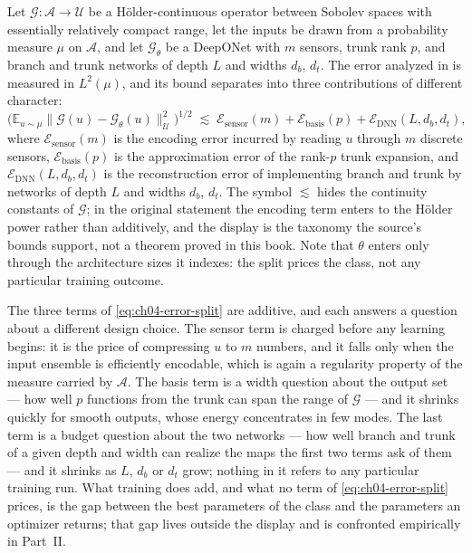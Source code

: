\begin{remark}
\label{thm:deeponet_error}
Let $\mathcal{G}: \mathcal{A} \to \mathcal{U}$ be a Hölder-continuous operator between Sobolev spaces with essentially relatively compact range, let the inputs be drawn from a probability measure $\mu$ on $\mathcal{A}$, and let $\mathcal{G}_\theta$ be a DeepONet with $m$ sensors, trunk rank $p$, and branch and trunk networks of depth $L$ and widths $d_b$, $d_t$. The error analyzed in \cite{lanthaler2022error} is measured in $L^{2}(\mu)$, and its bound separates into three contributions of different character:
\begin{equation}
  \label{eq:ch04-error-split}
  \Big( \mathbb{E}_{u \sim \mu} \big\| \mathcal{G}(u) - \mathcal{G}_\theta(u) \big\|_{\mathcal{U}}^{2} \Big)^{1/2}
  \;\lesssim\;
  \mathcal{E}_{\text{sensor}}(m) + \mathcal{E}_{\text{basis}}(p) + \mathcal{E}_{\text{DNN}}(L, d_b, d_t),
\end{equation}
where $\mathcal{E}_{\text{sensor}}(m)$ is the encoding error incurred by reading $u$ through $m$ discrete sensors, $\mathcal{E}_{\text{basis}}(p)$ is the approximation error of the rank-$p$ trunk expansion, and $\mathcal{E}_{\text{DNN}}(L, d_b, d_t)$ is the reconstruction error of implementing branch and trunk by networks of depth $L$ and widths $d_b$, $d_t$. The symbol $\lesssim$ hides the continuity constants of $\mathcal{G}$; in the original statement the encoding term enters to the Hölder power rather than additively, and the display is the taxonomy the source's bounds support, not a theorem proved in this book. Note that $\theta$ enters only through the architecture sizes it indexes: the split prices the class, not any particular training outcome.
\end{remark}

The three terms of \eqref{eq:ch04-error-split} are additive, and each answers a question about a different design choice. The sensor term is charged before any learning begins: it is the price of compressing $u$ to $m$ numbers, and it falls only when the input ensemble is efficiently encodable, which is again a regularity property of the measure carried by $\mathcal{A}$. The basis term is a width question about the output set --- how well $p$ functions from the trunk can span the range of $\mathcal{G}$ --- and it shrinks quickly for smooth outputs, whose energy concentrates in few modes. The last term is a budget question about the two networks --- how well branch and trunk of a given depth and width can realize the maps the first two terms ask of them --- and it shrinks as $L$, $d_b$ or $d_t$ grow; nothing in it refers to any particular training run. What training does add, and what no term of \eqref{eq:ch04-error-split} prices, is the gap between the best parameters of the class and the parameters an optimizer returns; that gap lives outside the display and is confronted empirically in Part~II.

